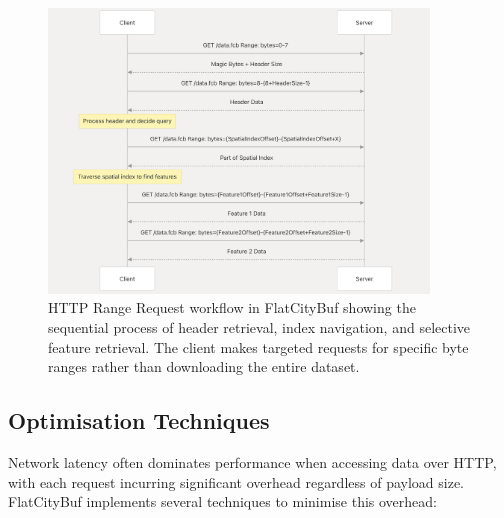 \begin{figure}[htbp]
  \centering
  \includegraphics[width=0.9\textwidth]{figs/methodology/http_range.png}
  \caption{HTTP Range Request workflow in FlatCityBuf showing the sequential process of header retrieval, index navigation, and selective feature retrieval. The client makes targeted requests for specific byte ranges rather than downloading the entire dataset.}
  \label{fig:methodology:http_range_requests:range_request_workflow}
\end{figure}

\subsection{Optimisation Techniques}
\label{methodology:http_range_requests:range_request_optimisations}

Network latency often dominates performance when accessing data over HTTP, with each request incurring significant overhead regardless of payload size. FlatCityBuf implements several techniques to minimise this overhead:

